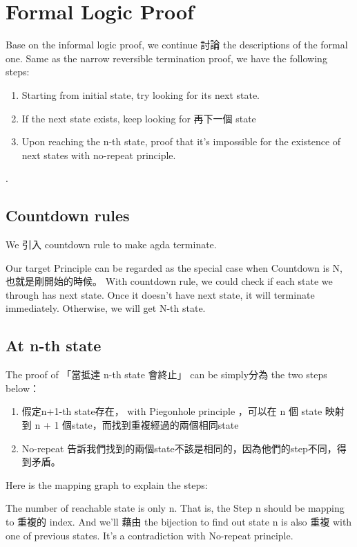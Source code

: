 \section{ Formal Logic Proof }

Base on the informal logic proof, we continue 討論 the descriptions of the formal one.
Same as the narrow reversible termination proof, we have the following steps:
\begin{enumerate}[1.]
    \item Starting from initial state, try looking for its next state. 
    \item If the next state exists, keep looking for 再下一個 state
    \item Upon reaching the n-th state, proof that it's impossible for the existence of next states with no-repeat principle.
\end{enumerate}.


\subsection{ Countdown rules }
We 引入 countdown rule to make agda terminate.


Our target Principle can be regarded as the special case when Countdown is N, 也就是剛開始的時候。
With countdown rule, we could check if each state we through has next state.  Once it doesn't have next state, it will terminate immediately.  Otherwise, we will get N-th state.

\subsection{ At n-th state }
The proof of 「當抵達 n-th state 會終止」 can be simply分為 the two steps below：
\begin{enumerate}[1.]
    \item 假定n+1-th state存在， with Piegonhole principle ，可以在 n 個 state 映射到 n + 1 個state，而找到重複經過的兩個相同state
    \item No-repeat 告訴我們找到的兩個state不該是相同的，因為他們的step不同，得到矛盾。
\end{enumerate}

Here is the mapping graph to explain the steps:


The number of reachable state is only n.  That is, the Step n should be mapping to 重複的 index.  And we'll 藉由 the bijection to find out state n is also 重複 with one of previous states.
It's a contradiction with No-repeat principle.

